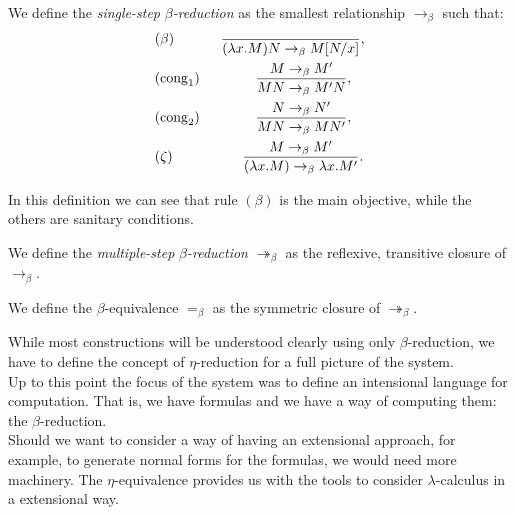 \begin{definition}
  We define the \emph{single-step} $\beta$\emph{-reduction} as the smallest relationship $\to_\beta$ such that:%
  \begin{align*}
    &(\beta) \qquad\ \ \  \ {\ \over(\lambda x.M)N \to_\beta M[N/x]},\\
    &(\operatorname{cong}_1)\qquad\qquad{ M \to_\beta M' \over MN \to_\beta M'N },\\
    &(\operatorname{cong}_2)\qquad\qquad{ N \to_\beta N' \over MN \to_\beta MN' },\\
    &(\zeta) \qquad\qquad \ \  \ {M\to_\beta M' \over(\lambda x.M) \to_\beta \lambda x.M'}.\\
  \end{align*}
\end{definition}

In this definition we can see that rule $(\beta)$ is the main objective, while the others are sanitary conditions.

\begin{definition}
We define the \emph{multiple-step} $\beta$\emph{-reduction} $\twoheadrightarrow_\beta$ as the reflexive, transitive closure of $\to_\beta$.
\end{definition}
\begin{definition}
  We define the $\beta$-equivalence $=_\beta$ as the symmetric closure of $\twoheadrightarrow_\beta$.
\end{definition}

While most constructions will be understood clearly using only $\beta$-reduction, we have to define the concept of $\eta$-reduction for a full picture of the system.\\


Up to this point the focus of the system was to define an intensional language for computation. That is, we have formulas and we have a way of computing them: the $\beta$-reduction. \\


Should we want to consider a way of having an extensional approach, for example, to generate normal forms for the formulas, we would need more machinery. The $\eta$-equivalence provides us with the tools to consider $\lambda$-calculus in a extensional way. \\

